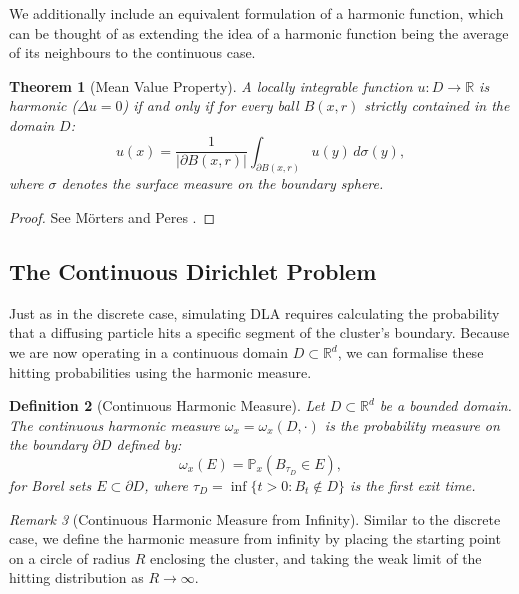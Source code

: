 \documentclass[12pt, a4paper, oneside]{report}
\newtheorem{theorem}{Theorem}[chapter]
\newtheorem{definition}[theorem]{Definition}
\theoremstyle{remark}
\newtheorem{remark}[theorem]{Remark}
\begin{document}
We additionally include an equivalent formulation of a harmonic function, which can be thought of as extending the idea of a harmonic function being the average of its neighbours to the continuous case. 
\begin{theorem}[Mean Value Property]
\label{the:mean_value}
A locally integrable function $u: D \to \mathbb{R}$ is harmonic ($\Delta u = 0$) if and only if for every ball $B(x,r)$ strictly contained in the domain $D$:
\begin{equation*}
    u(x) = \frac{1}{|\partial B(x,r)|} \int_{\partial B(x,r)} u(y) \, d\sigma(y),
\end{equation*}
where $\sigma$ denotes the surface measure on the boundary sphere.
\end{theorem}

\begin{proof}
See M{\"o}rters and Peres \cite[Theorem 3.2]{Morters2010}.
\end{proof}

\subsection{The Continuous Dirichlet Problem}
Just as in the discrete case, simulating DLA requires calculating the probability that a diffusing particle hits a specific segment of the cluster's boundary. Because we are now operating in a continuous domain $D \subset \mathbb{R}^d$, we can formalise these hitting probabilities using the harmonic measure.

\begin{definition}[Continuous Harmonic Measure]
Let $D \subset \mathbb{R}^d$ be a bounded domain. The continuous harmonic measure $\omega_x = \omega_x(D, \cdot)$ is the probability measure on the boundary $\partial D$ defined by:
\begin{equation*}
    \omega_x(E) = \mathbb{P}_x(B_{\tau_D} \in E),
\end{equation*}
for Borel sets $E \subset \partial D$, where $\tau_D = \inf\{t > 0 : B_t \notin D\}$ is the first exit time.
\end{definition}

\begin{remark}[Continuous Harmonic Measure from Infinity]
Similar to the discrete case, we define the harmonic measure from infinity by placing the starting point on a circle of radius $R$ enclosing the cluster, and taking the weak limit of the hitting distribution as $R \to \infty$.
\end{remark}
\end{document}
